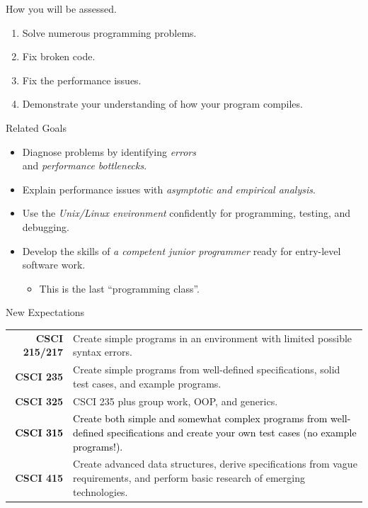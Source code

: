 \documentclass[14pt,aspectratio=1610]{beamer}
\begin{document}
\begin{frame}{How you will be assessed.}

  \large
\begin{enumerate}[<+->]
  \item Solve numerous programming problems.
  \item Fix broken code.
  \item Fix the performance issues.
  \item Demonstrate your understanding of how your program compiles.
\end{enumerate}
\end{frame}

\begin{frame}{Related Goals}
\begin{itemize}[<+->]
  \item Diagnose problems by identifying \emph{errors}\\ and \emph{performance bottlenecks}.
  \item Explain performance issues with \emph{asymptotic and empirical analysis}.
  \item  Use the \emph{Unix/Linux environment} confidently for programming, testing, and debugging.
  \item Develop the skills of \emph{a competent junior programmer} ready for entry-level software work.
  \begin{itemize}
  \item
    This is the last ``programming class''.
  \end{itemize}
\end{itemize}
\end{frame}

\begin{frame}{New Expectations}
\begingroup
  \small
  \renewcommand{\arraystretch}{1.25}
  \begin{tabularx}{1\textwidth}{r X}
  \textbf{CSCI 215/217}  & Create simple programs in an environment with limited possible syntax errors. \\
  \textbf{CSCI 235}      & Create simple programs from well-defined
    specifications, solid test cases, and example programs. \\
  \textbf{CSCI 325}      & CSCI 235 plus group work, OOP, and generics. \\
  \rowcolor{CSUgold}\textcolor{black}{\textbf{CSCI 315}}      &\textcolor{black}{Create both simple and somewhat complex programs
    from well-defined specifications and create your own test cases (no example
    programs!).} \\
  \textbf{CSCI 415}      & Create advanced data structures, derive specifications from vague
    requirements, and perform basic research of emerging technologies. \\
  \end{tabularx}
\endgroup
\end{frame}
\end{document}
